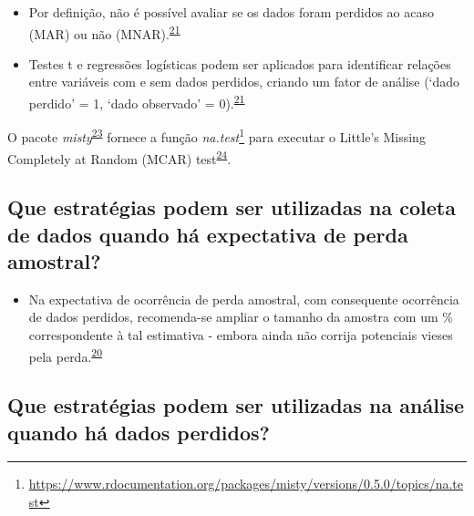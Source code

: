 \documentclass[
]{book}
\providecommand{\tightlist}{%
  \setlength{\itemsep}{0pt}\setlength{\parskip}{0pt}}
\renewcommand{\href}[2]{#2\footnote{\url{#1}}}
\newenvironment{infobox}[1]
  {
  \begin{itemize}
  \renewcommand{\labelitemi}{
    \raisebox{-.7\height}[0pt][0pt]{
      {\setkeys{Gin}{width=3em,keepaspectratio}
        \texttt{[image: \#1]}}
    }
  }
  \setlength{\fboxsep}{1em}
  \begin{blackbox}
  \item
  }
  {
  \end{blackbox}
  \end{itemize}
  }
\begin{document}
\begin{itemize}
\item
  Por definição, não é possível avaliar se os dados foram perdidos ao acaso (MAR) ou não (MNAR).\textsuperscript{\protect\hyperlink{ref-Heymans2022}{21}}
\item
  Testes t e regressões logísticas podem ser aplicados para identificar relações entre variáveis com e sem dados perdidos, criando um fator de análise (`dado perdido' = 1, `dado observado' = 0).\textsuperscript{\protect\hyperlink{ref-Heymans2022}{21}}
\end{itemize}

\begin{infobox}{images/Rlogo}
O pacote \emph{misty}\textsuperscript{\protect\hyperlink{ref-misty}{23}} fornece a função \href{https://www.rdocumentation.org/packages/misty/versions/0.5.0/topics/na.test}{\emph{na.test}} para executar o Little's Missing Completely at Random (MCAR) test\textsuperscript{\protect\hyperlink{ref-little1988}{24}}.

\end{infobox}

\hypertarget{que-estratuxe9gias-podem-ser-utilizadas-na-coleta-de-dados-quando-huxe1-expectativa-de-perda-amostral}{%
\subsection{Que estratégias podem ser utilizadas na coleta de dados quando há expectativa de perda amostral?}\label{que-estratuxe9gias-podem-ser-utilizadas-na-coleta-de-dados-quando-huxe1-expectativa-de-perda-amostral}}

\begin{itemize}
\tightlist
\item
  Na expectativa de ocorrência de perda amostral, com consequente ocorrência de dados perdidos, recomenda-se ampliar o tamanho da amostra com um \% correspondente à tal estimativa - embora ainda não corrija potenciais vieses pela perda.\textsuperscript{\protect\hyperlink{ref-Altman2007}{20}}
\end{itemize}

\hypertarget{que-estratuxe9gias-podem-ser-utilizadas-na-anuxe1lise-quando-huxe1-dados-perdidos}{%
\subsection{Que estratégias podem ser utilizadas na análise quando há dados perdidos?}\label{que-estratuxe9gias-podem-ser-utilizadas-na-anuxe1lise-quando-huxe1-dados-perdidos}}
\end{document}
